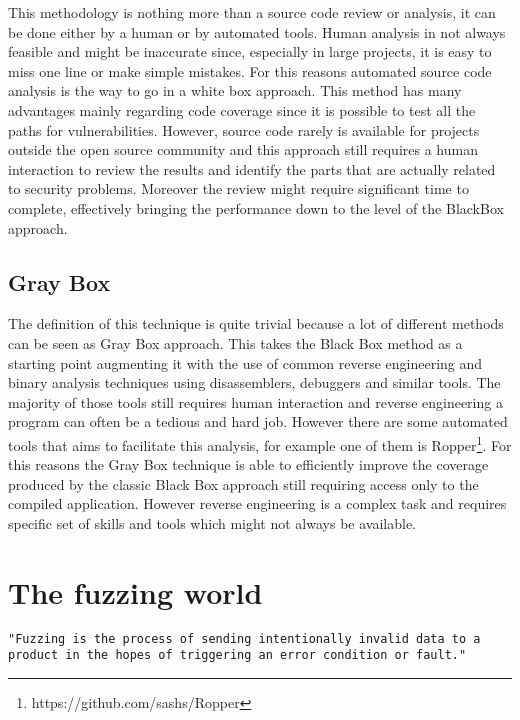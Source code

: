 \documentclass[../main.tex]{subfiles}
\begin{document}
This methodology is nothing more than a source code review or analysis, it can be
done either by a human or by automated tools. Human analysis in not always
feasible and might be inaccurate since, especially in large projects, it is easy
to miss one line or make simple mistakes. For this reasons automated source code
analysis is the way to go in a white box approach. This method has many
advantages mainly regarding code coverage since it is possible to test all the
paths for vulnerabilities. However, source code rarely is available for projects
outside the open source community and this approach still requires a human
interaction to review the results and identify the parts that are actually
related to security problems. Moreover the review might require significant time
to complete, effectively bringing the performance down to the level of the
BlackBox approach.

\subsection{Gray Box}

The definition of this technique is quite trivial because a lot of different
methods can be seen as Gray Box approach. This takes the Black Box method as a
starting point augmenting it with the use of common reverse engineering and
binary analysis techniques using disassemblers, debuggers and similar tools. The
majority of those tools still requires human interaction and reverse engineering
a program can often be a tedious and hard job. However there are some automated
tools that aims to facilitate this analysis, for example one of them is
Ropper\footnote{https://github.com/sashs/Ropper}. For this reasons the Gray Box
technique is able to efficiently improve the coverage produced by the classic
Black Box approach still requiring access only to the compiled application.
However reverse engineering is a complex task and requires specific set of
skills and tools which might not always be available.

\section{The fuzzing world}


\texttt{"Fuzzing is the process of sending intentionally invalid data to a
product in the hopes of triggering an error condition or fault."}
\cite{Sutton2007}
\end{document}
